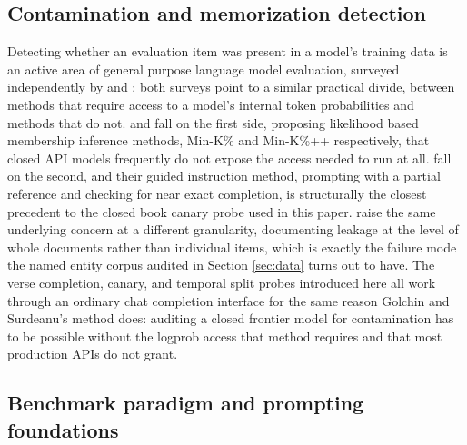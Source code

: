 \documentclass[pdflatex,sn-mathphys-ay]{sn-jnl}
\begin{document}
\subsection{Contamination and memorization detection}

Detecting whether an evaluation item was present in a model's training data is an active area of general purpose language model evaluation, surveyed independently by \citet{xu2024contaminationsurvey} and \citet{cheng2025contaminationsurvey}; both surveys point to a similar practical divide, between methods that require access to a model's internal token probabilities and methods that do not. \citet{shi2023detecting} and \citet{zhang2024minkpp} fall on the first side, proposing likelihood based membership inference methods, Min-K\% and Min-K\%++ respectively, that closed API models frequently do not expose the access needed to run at all. \citet{golchin2024timetravel} fall on the second, and their guided instruction method, prompting with a partial reference and checking for near exact completion, is structurally the closest precedent to the closed book canary probe used in this paper. \citet{elangovan2021memorization} raise the same underlying concern at a different granularity, documenting leakage at the level of whole documents rather than individual items, which is exactly the failure mode the named entity corpus audited in Section \ref{sec:data} turns out to have. The verse completion, canary, and temporal split probes introduced here all work through an ordinary chat completion interface for the same reason Golchin and Surdeanu's method does: auditing a closed frontier model for contamination has to be possible without the logprob access that method requires and that most production APIs do not grant.

\subsection{Benchmark paradigm and prompting foundations}
\end{document}
